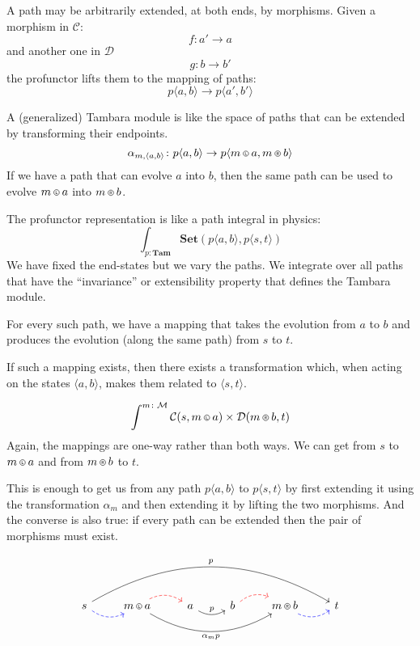\documentclass[11pt]{amsart}
\newcommand*\circled[3]
  {\tikz[baseline={([yshift=#2]current bounding box.center)}]{
      \node[shape=circle,draw,inner sep=#1] (char) {#3};}}
\newcommand{\actL}{\mathbin{\circled{0.5pt}{-0.55ex}{\scalebox{0.75}{\tiny{$\mathsf{L}$}}}}}
\newcommand{\actR}{\mathbin{\circled{0.5pt}{-0.55ex}{\scalebox{0.75}{\tiny{$\mathsf{R}$}}}}}
\begin{document}
A path may be arbitrarily extended, at both ends, by morphisms. Given a morphism in $\mathcal{C}$:
\[ f \colon a' \to a \]
and another one in $\mathcal{D}$
\[g \colon b \to b' \]
the profunctor lifts them to the mapping of paths:
\[ p \langle a, b \rangle \to p \langle a', b' \rangle \]


A (generalized) Tambara module is like the space of paths that can be extended by transforming their endpoints.
\[ \alpha_{m, \langle a, b \rangle} \colon p \langle a, b \rangle \to p \langle m \actL a, m \actR b\rangle \]
If we have a path that can evolve $a$ into $b$, then the same path can be used to evolve $m \actL a$ into $m \actR b$. 

The profunctor representation is like a path integral in physics:
\[ \int_{p \colon \mathbf{Tam}} \mathbf{Set}( p \langle a, b \rangle, p \langle s, t \rangle) \]
We have fixed the end-states but we vary the paths. We integrate over all paths that have the ``invariance'' or extensibility property that defines the Tambara module. 

For every such path, we have a mapping that takes the evolution from $a$ to $b$ and produces the evolution (along the same path) from $s$ to $t$. 

If such a mapping exists, then there exists a transformation which, when acting on the states $\langle a, b \rangle$, makes them related to $\langle s, t \rangle$. 

\[ \int^{m \colon \mathcal{M}} \mathcal{C}(s, m \actL a) \times \mathcal{D}(m \actR b, t)\]
Again, the mappings are one-way rather than both ways. We can get from $s$ to $m \actL a$ and from $m \actR b$ to $t$. 

This is enough to get us from any path $p \langle a, b \rangle$ to  $p \langle s, t \rangle$ by first extending it using the transformation $\alpha_m$ and then extending it by lifting the two morphisms. And the converse is also true: if every path can be extended then the pair of morphisms must exist.

\[
 \begin{tikzcd}
 s
 \arrow[r, bend right, dashed, blue]
 \arrow[rrrrr, bend left, "p"]
 & m \actL a
  \arrow[r, bend left, dashed, red]
  \arrow[rrr, bend right, "\alpha_m p"']
 & a
 \arrow[r, bend right, "p"]
 & b
  \arrow[r, bend left, dashed, red]
 & m \actR b
 \arrow[r, bend right, dashed, blue]
 & t
 \end{tikzcd}
\]
\end{document}
